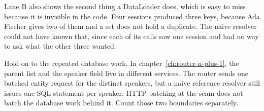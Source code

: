 %
Lane B also shows the second thing a DataLoader does, which is easy to miss
because it is invisible in the code. Four sessions produced three keys, because
Ada Fischer gives two of them and a set does not hold a duplicate. The naive
resolver could not have known that, since each of its calls saw one session and
had no way to ask what the other three wanted.

%
Hold on to the repeated database work. In
chapter~\ref{ch:router-n-plus-1}, the parent list and the speaker field live
in different services. The router sends one batched entity request for the
distinct speakers, but a naive reference resolver still issues one SQL
statement per speaker. HTTP batching at the seam does not batch the database
work behind it. Count those two boundaries separately.
%
